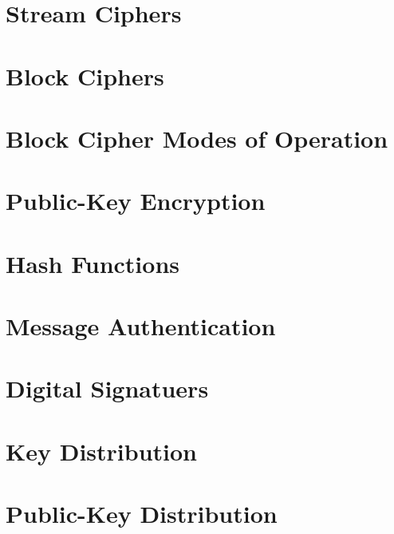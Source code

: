\documentclass{article}
\begin{document}
\section{Stream Ciphers}
\section{Block Ciphers}
\section{Block Cipher Modes of Operation}
\section{Public-Key Encryption}
\section{Hash Functions}
\section{Message Authentication}
\section{Digital Signatuers}
\section{Key Distribution}
\section{Public-Key Distribution}
\clearpage

\glsaddall
\printglossary[nonumberlist]
\printglossary[nonumberlist,type=\acronymtype]
\end{document}
